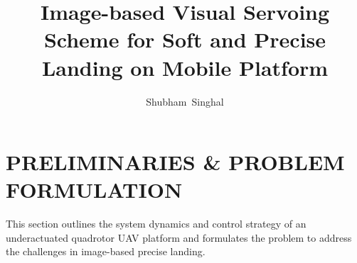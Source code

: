\documentclass[lettersize,journal]{IEEEtran}
\begin{document}
\title{Image-based Visual Servoing Scheme for Soft and Precise Landing on Mobile Platform}

\author{Shubham~Singhal}


\maketitle
\section{PRELIMINARIES \& PROBLEM FORMULATION} \label{background: section}
This section outlines the system dynamics and control strategy of an underactuated quadrotor UAV platform and formulates the problem to address the challenges in image-based precise landing.
\end{document}
